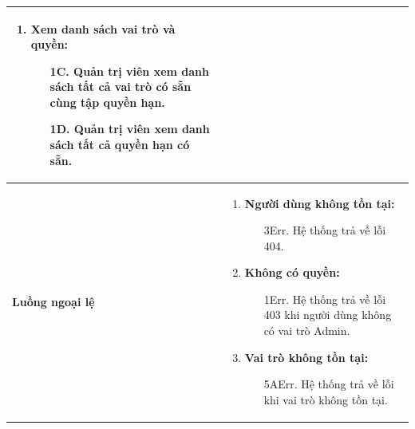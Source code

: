 {\begin{tabularx}{\textwidth}{|>{\raggedright\arraybackslash}X|>{\raggedright\arraybackslash}X|}
\begin{enumerate}
    \item \textbf{Xem danh sách vai trò và quyền:}
    \begin{enumerate}
        \item[1C.] Quản trị viên xem danh sách tất cả vai trò có sẵn cùng tập quyền hạn.
        \item[1D.] Quản trị viên xem danh sách tất cả quyền hạn có sẵn.
    \end{enumerate}
\end{enumerate} \\
\hline
\textbf{Luồng ngoại lệ} &
\begin{enumerate}
    \item \textbf{Người dùng không tồn tại:}
    \begin{enumerate}
        \item[3Err.] Hệ thống trả về lỗi 404.
    \end{enumerate}
    \item \textbf{Không có quyền:}
    \begin{enumerate}
        \item[1Err.] Hệ thống trả về lỗi 403 khi người dùng không có vai trò Admin.
    \end{enumerate}
    \item \textbf{Vai trò không tồn tại:}
    \begin{enumerate}
        \item[5AErr.] Hệ thống trả về lỗi khi vai trò không tồn tại.
    \end{enumerate}
\end{enumerate} \\
\hline
\end{tabularx}
}
